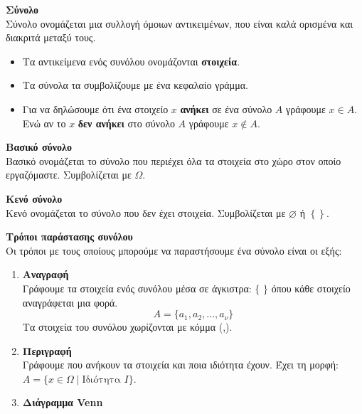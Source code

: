 \documentclass[twoside,nofonts,internet,math,spyros]{frontisthrio}
\begin{document}
\begin{arithmisi}
\item\textbf{Σύνολο}\\
Σύνολο ονομάζεται μια συλλογή όμοιων αντικειμένων, που είναι καλά ορισμένα και διακριτά μεταξύ τους.
\begin{itemize}[itemsep=0mm]
\item Τα αντικείμενα ενός συνόλου ονομάζονται \textbf{στοιχεία}.
\item Τα σύνολα τα συμβολίζουμε με ένα κεφαλαίο γράμμα.
\item Για να δηλώσουμε ότι ένα στοιχείο $ x $ \textbf{ανήκει} σε ένα σύνολο $ A $ γράφουμε $ x\in A $. Ενώ αν το $ x $ \textbf{δεν ανήκει} στο σύνολο $ A $ γράφουμε $ x\notin A $.
\end{itemize}
\item\textbf{Βασικό σύνολο}\\
Βασικό ονομάζεται το σύνολο που περιέχει όλα τα στοιχεία στο χώρο στον οποίο εργαζόμαστε. Συμβολίζεται με $ \varOmega $.
\item\textbf{Κενό σύνολο}\\
Κενό ονομάζεται το σύνολο που δεν έχει στοιχεία. Συμβολίζεται με $ \varnothing $ ή $ \left\lbrace \right\rbrace  $.
\item\textbf{Τρόποι παράστασης συνόλου}\\
Οι τρόποι με τους οποίους μπορούμε να παραστήσουμε ένα σύνολο είναι οι εξής:
\vspace{-2mm}
\begin{enumerate}[label=\bf\arabic*.]
\item \textbf{Αναγραφή}\\
Γράφουμε τα στοιχεία ενός συνόλου μέσα σε άγκιστρα: $ \{\,\,\} $ όπου κάθε στοιχείο αναγράφεται μια φορά.
\[ A=\{a_1,a_2,\ldots,a_\nu\} \]
Τα στοιχεία του συνόλου χωρίζονται με κόμμα (,).
\item \textbf{Περιγραφή}\\
Γράφουμε που ανήκουν τα στοιχεία και ποια ιδιότητα έχουν. Έχει τη μορφή: $ A=\{x\in\varOmega\;|\;\textrm{Ιδιότητα }I\} $.
\item \textbf{Διάγραμμα Venn}\\
\mbox{}\\

\end{enumerate}
\end{arithmisi}
\end{document}
